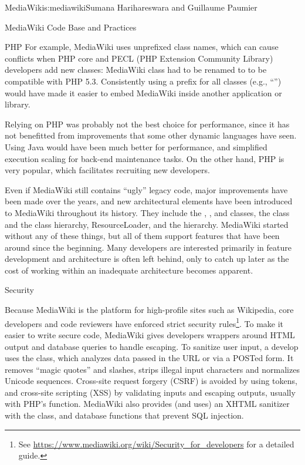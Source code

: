 \begin{aosachapter}{MediaWiki}{s:mediawiki}{Sumana Harihareswara and Guillaume Paumier}
\begin{aosasect1}{MediaWiki Code Base and Practices}
\begin{aosasect2}{PHP}
For example, MediaWiki uses unprefixed class names, which can cause
conflicts when PHP core and PECL (PHP Extension Community Library)
developers add new classes: MediaWiki  class had to be
renamed to  to be compatible with PHP
5.3. Consistently using a prefix for all classes (e.g., ``'')
would have made it easier to embed MediaWiki inside another
application or library.

Relying on PHP was probably not the best choice for performance, since
it has not benefitted from improvements that some other dynamic
languages have seen. Using Java would have been much better for
performance, and simplified execution scaling for back-end maintenance
tasks. On the other hand, PHP is very popular, which facilitates
recruiting new developers.

Even if MediaWiki still contains ``ugly'' legacy code, major
improvements have been made over the years, and new architectural
elements have been introduced to MediaWiki throughout its
history. They include the , , and
 classes, the  class and the
 class hierarchy, ResourceLoader, and the 
hierarchy. MediaWiki started without any of these things, but all of
them support features that have been around since the beginning. Many
developers are interested primarily in feature development and
architecture is often left behind, only to catch up later as the cost
of working within an inadequate architecture becomes apparent.

\end{aosasect2}

\begin{aosasect2}{Security}

Because MediaWiki is the platform for high-profile sites such as
Wikipedia, core developers and code reviewers have enforced strict
security rules\footnote{See
  \url{https://www.mediawiki.org/wiki/Security_for_developers} for a
  detailed guide.}. To make it easier to write secure code, MediaWiki
gives developers wrappers around HTML output and database queries to
handle escaping. To sanitize user input, a develop uses the
 class, which analyzes data passed in the URL or via
a POSTed form. It removes ``magic quotes'' and slashes, strips illegal input
characters and normalizes Unicode sequences. Cross-site request
forgery (CSRF) is avoided by using tokens, and cross-site scripting
(XSS) by validating inputs and escaping outputs, usually with PHP's
 function. MediaWiki also provides (and uses)
an XHTML sanitizer with the  class, and database
functions that prevent SQL injection.


\end{aosasect2}
\end{aosasect1}
\end{aosachapter}
